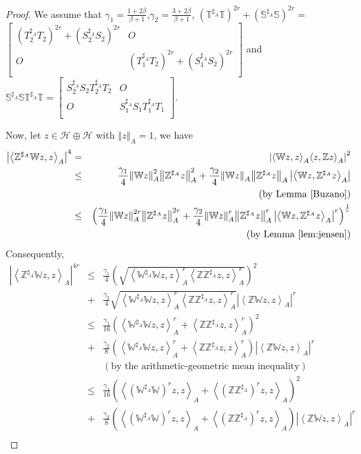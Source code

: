 \documentclass{article}
\newcommand{\bra}[1]{\left(#1\right)}
\newcommand{\seqA}[1]{{\left<#1\right>}_{A}}
\newcommand{\normA}[1]{{\left\Vert#1\right\Vert}_{A}}
\newcommand{\abs}[1]{\left\vert#1\right\vert}
\newcommand{\hh}{\mathcal{H}\oplus\mathcal{H}}
\newcommand {\W}{\mathbb{W}}
\newcommand {\Wa}{\mathbb{W}^{\sharp_{A}}}
\newcommand {\Z}{\mathbb{Z}}
\newcommand {\Za}{\mathbb{Z}^{\sharp_{A}}}
\newcommand {\T}{\mathbb{T}}
\renewcommand {\S}{\mathbb{S}}
\newcommand {\Ta}{\mathbb{T}^{\sharp_{A}}}
\newcommand {\Sa}{\mathbb{S}^{\sharp_{A}}}
\newcommand {\Toa}{T_{1}^{\sharp_{A}}}
\newcommand {\Soa}{S_{1}^{\sharp_{A}}}
\newcommand {\Tta}{T_{2}^{\sharp_{A}}}
\newcommand {\Sta}{S_{2}^{\sharp_{A}}}
\begin{document}
 \begin{proof} We assume that $\gamma_1=\frac{1+2\beta}{\beta+1}$,$\gamma_2=\frac{3+2\beta}{\beta+1}$,
 $(\Ta\T)^{2r}+(\Sa\S)^{2r}=$ \\$\begin{bmatrix} \bra{\Tta T_2}^{2r}+\bra{\Sta S_2}^{2r}& O\\ O&
 \bra{\Toa T_2}^{2r}+\bra{\Soa S_2}^{2r} \\\end{bmatrix}$
  and $\Sa \S\Ta\T=\begin{bmatrix}\Sta S_2\Tta T_2& O\\ O& \Soa S_1\Toa T_1 \\\end{bmatrix}$.

 Now, let $z\in\hh$ with $\normA{z}=1$, we have
 \begin{eqnarray*}
   \abs{\seqA{\Za\W z,z}}^{4} &=&\abs{\seqA{\W z,z}\seqA{z,\Z z}}^2 \\
    &\leq& \frac{\gamma_1}{4}\normA{\W z}^2\normA{\Za z}^2+\frac{\gamma_2}{4}\normA{\W z}\normA{\Za z}\abs{\seqA{\W z,\Za z}}\\
    &&\bra{\mbox{by Lemma \ref{Buzano}}}\\
    &\leq& \bra{\frac{\gamma_1}{4}\normA{\W z}^{2r}\normA{\Za z}^{2r}
    +\frac{\gamma_2}{4}\normA{\W z}^{r}\normA{\Za z}^{r}\abs{\seqA{\W z,\Za z}}^{r}}^{\frac{1}{r}}\\
    &&\bra{\mbox{by Lemma \ref{lem:jensen}}}
 \end{eqnarray*}
 Consequently,
 \begin{eqnarray*}
   \abs{\seqA{\Za\W z,z}}^{4r} &\leq&\frac{\gamma_1}{4}\bra{\sqrt{\seqA{\Wa\W z,z}^{r}\seqA{\Z\Za z,z}^{r}}}^{2}\\
   &+&
    \frac{\gamma_2}{4}\sqrt{\seqA{\Wa\W z,z}^{r}\seqA{\Z\Za z,z}^{r}}\abs{\seqA{\Z\W z, z}}^{r}\\
    &\leq&\frac{\gamma_1}{16}\bra{\seqA{\Wa\W z,z}^{r}+\seqA{\Z\Za z,z}^{r}}^2\\
    &+&\frac{\gamma_2}{8}\bra{\seqA{\Wa\W z,z}^{r}+\seqA{\Z\Za z,z}^{r}}\abs{\seqA{\Z\W z, z}}^{r}\\
    &&\bra{\mbox{by the arithmetic-geometric mean inequality}}\\
    &\leq& \frac{\gamma_1}{16}\bra{\seqA{\bra{\Wa\W}^{r} z,z}+\seqA{\bra{\Z\Za}^{r} z,z}}^2\\
    &+&\frac{\gamma_2}{8}\bra{\seqA{\bra{\Wa\W}^{r} z,z}+\seqA{\bra{\Z\Za}^{r} z,z}}\abs{\seqA{\Z\W z, z}}^{r}\\

\end{eqnarray*}
\end{proof}
\end{document}
